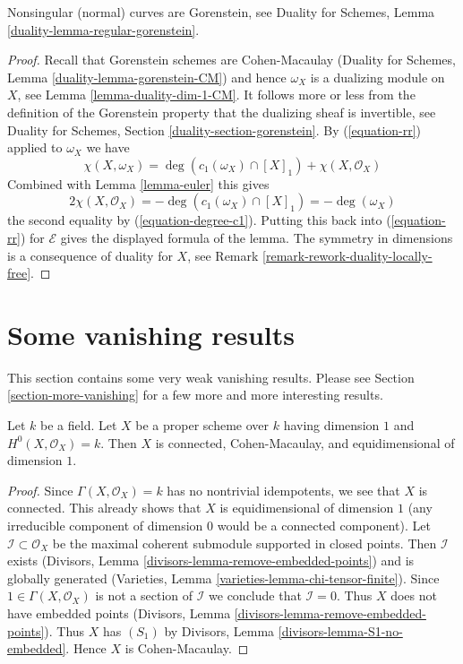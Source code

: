 \noindent
Nonsingular (normal) curves are Gorenstein, see
Duality for Schemes, Lemma \ref{duality-lemma-regular-gorenstein}.

\begin{proof}
Recall that Gorenstein schemes are Cohen-Macaulay
(Duality for Schemes, Lemma \ref{duality-lemma-gorenstein-CM})
and hence $\omega_X$ is a dualizing module on $X$, see
Lemma \ref{lemma-duality-dim-1-CM}.
It follows more or less from the definition of the Gorenstein property
that the dualizing sheaf is invertible, see
Duality for Schemes, Section \ref{duality-section-gorenstein}.
By (\ref{equation-rr}) applied to $\omega_X$ we have
$$
\chi(X, \omega_X) = 
\deg(c_1(\omega_X) \cap [X]_1) + \chi(X, \mathcal{O}_X)
$$
Combined with Lemma \ref{lemma-euler} this gives
$$
2\chi(X, \mathcal{O}_X) = - \deg(c_1(\omega_X) \cap [X]_1) = - \deg(\omega_X)
$$
the second equality by (\ref{equation-degree-c1}). Putting this back into
(\ref{equation-rr}) for $\mathcal{E}$ gives the displayed formula of the lemma.
The symmetry in dimensions is a consequence of duality for $X$, see
Remark \ref{remark-rework-duality-locally-free}.
\end{proof}





\section{Some vanishing results}
\label{section-vanishing}

\noindent
This section contains some very weak vanishing results.
Please see Section \ref{section-more-vanishing} for
a few more and more interesting results.

\begin{lemma}
\label{lemma-automatic}
Let $k$ be a field. Let $X$ be a proper scheme over $k$ having dimension $1$
and $H^0(X, \mathcal{O}_X) = k$. Then $X$ is connected, Cohen-Macaulay,
and equidimensional of dimension $1$.
\end{lemma}

\begin{proof}
Since $\Gamma(X, \mathcal{O}_X) = k$ has no nontrivial idempotents,
we see that $X$ is connected. This already shows that $X$ is
equidimensional of dimension $1$ (any irreducible component
of dimension $0$ would be a connected component).
Let $\mathcal{I} \subset \mathcal{O}_X$
be the maximal coherent submodule supported in closed points.
Then $\mathcal{I}$ exists
(Divisors, Lemma \ref{divisors-lemma-remove-embedded-points})
and is globally generated
(Varieties, Lemma \ref{varieties-lemma-chi-tensor-finite}).
Since $1 \in \Gamma(X, \mathcal{O}_X)$ is not a section
of $\mathcal{I}$ we conclude that $\mathcal{I} = 0$.
Thus $X$ does not have embedded points
(Divisors, Lemma \ref{divisors-lemma-remove-embedded-points}).
Thus $X$ has $(S_1)$ by
Divisors, Lemma \ref{divisors-lemma-S1-no-embedded}.
Hence $X$ is Cohen-Macaulay.
\end{proof}


